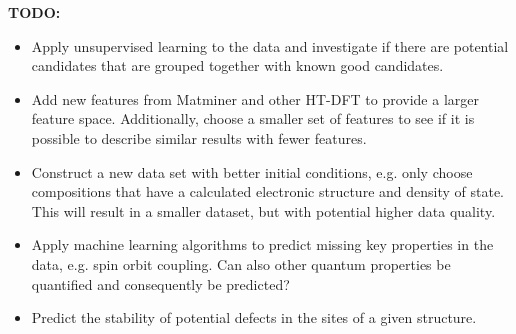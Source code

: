 \textbf{TODO:}
\begin{itemize}
  \item Apply unsupervised learning to the data and investigate if there are potential candidates that are grouped together with known good candidates.
  \item Add new features from Matminer and other HT-DFT to provide a larger feature space. Additionally, choose a smaller set of features to see if it is possible to describe similar results with fewer features.
  \item Construct a new data set with better initial conditions, e.g. only choose compositions that have a calculated electronic structure and density of state. This will result in a smaller dataset, but with potential higher data quality.
  \item Apply machine learning algorithms to predict missing key properties in the data, e.g. spin orbit coupling. Can also other  quantum properties be quantified and consequently be predicted?
  \item Predict the stability of potential defects in the sites of a given structure.
\end{itemize}


